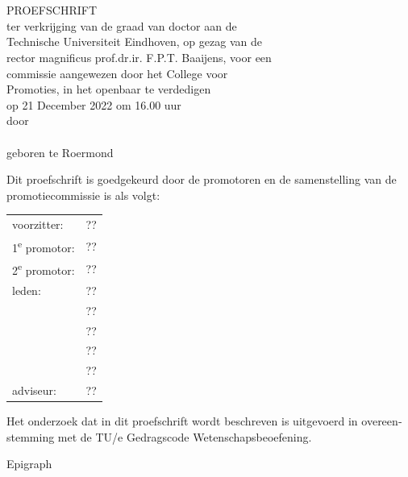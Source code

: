 \newpage
\thispagestyle{empty}
\begin{otherlanguage}{dutch}

\vspace*{\fill}

\begin{center}
\iftuefont
\huge{\tuefontscala\selectfont \maintitle}\\[30mm]
\else
\huge{\sffamily\selectfont \maintitle}\\[30mm]
\fi
\normalsize {PROEFSCHRIFT}\\[8mm]
ter verkrijging van de graad van doctor aan de\\
Technische Universiteit Eindhoven, op gezag van de\\
rector magnificus prof.dr.ir. F.P.T. Baaijens, voor een\\
commissie aangewezen door het College voor\\
Promoties, in het openbaar te verdedigen\\
op 21 December 2022 om 16.00 uur\\[8mm]
door
\\[8mm]
\@author
\\[2mm]
geboren te Roermond
\end{center}

\vspace*{\fill}


\newpage
\thispagestyle{empty}
Dit proefschrift is goedgekeurd door de promotoren en de samenstelling van de promotiecommissie is als volgt:\\[\baselineskip]
\begin{tabular}{@{}ll}
voorzitter:	& ??\\
1\textsuperscript{e} promotor:	& ??\\
2\textsuperscript{e} promotor:	& ??\\
leden:		& ??\\
			& ??\\
			& ??\\
			& ??\\
			& ??\\
adviseur:	& ??
\end{tabular}

\vspace*{\fill}

\begin{flushleft}
Het onderzoek dat in dit proefschrift wordt beschreven is uitgevoerd in overeenstemming met de TU/e Gedragscode Wetenschapsbeoefening.
\end{flushleft}

\end{otherlanguage}

\clearpage
\thispagestyle{empty}

\vspace*{\fill}

\begin{center}
  Epigraph
\end{center}

\vspace*{\fill}

\endgroup
